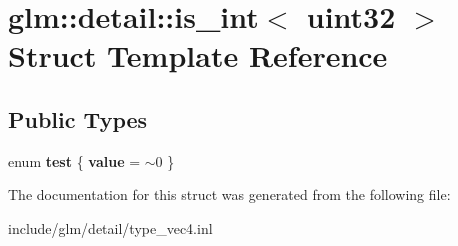 \hypertarget{structglm_1_1detail_1_1is__int_3_01uint32_01_4}{}\section{glm\+:\+:detail\+:\+:is\+\_\+int$<$ uint32 $>$ Struct Template Reference}
\label{structglm_1_1detail_1_1is__int_3_01uint32_01_4}
\subsection*{Public Types}
\begin{DoxyCompactItemize}
\item 
\mbox{\label{structglm_1_1detail_1_1is__int_3_01uint32_01_4_a8930e3fe143b2eb718be340178475095}} 
enum {\bfseries test} \{ {\bfseries value} = $\sim$0
 \}
\end{DoxyCompactItemize}


The documentation for this struct was generated from the following file\+:\begin{DoxyCompactItemize}
\item 
include/glm/detail/type\+\_\+vec4.\+inl\end{DoxyCompactItemize}
